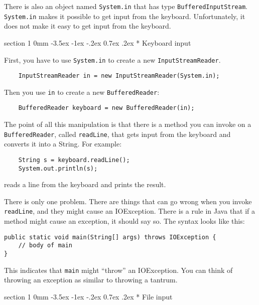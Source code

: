 \documentclass{book}
\makeatletter
\renewcommand{\section}{\@startsection 
    {section} {1} {0mm}%
    {-3.5ex \@plus -1ex \@minus -.2ex}%
    {0.7ex \@plus.2ex}%
    {\normalfont\Large\bfseries}}
\makeatother
\begin{document}
There is also an object named {\tt System.in} that has
type {\tt BufferedInputStream}.  {\tt System.in} makes it
possible to get input from the keyboard.  Unfortunately,
it does not make it easy to get input from the keyboard.


\section* {Keyboard input}
\label{keyboard}

First, you have to use {\tt System.in} to create a new
{\tt InputStreamReader}.

\begin{verbatim}
    InputStreamReader in = new InputStreamReader(System.in);
\end{verbatim}
%
Then you use {\tt in} to create a new {\tt BufferedReader}:

\begin{verbatim}
    BufferedReader keyboard = new BufferedReader(in);
\end{verbatim}
%
The point of all this manipulation is that there is a method
you can invoke on a {\tt BufferedReader}, called {\tt readLine},
that gets input from the keyboard and converts it into a
String.  For example:

\begin{verbatim}
    String s = keyboard.readLine();
    System.out.println(s);
\end{verbatim}
%
reads a line from the keyboard and prints the result.

There is only one problem.  There are things that can go wrong
when you invoke {\tt readLine}, and they might cause an
IOException.  There is a rule in Java that if a method might
cause an exception, it should say so.  The syntax looks
like this:

\begin {verbatim}
public static void main(String[] args) throws IOException {
    // body of main
}
\end{verbatim}

This indicates that {\tt main} might ``throw'' an IOException.
You can think of throwing an exception as similar to throwing
a tantrum.


\section* {File input}
\label{fileIO}
\end{document}
